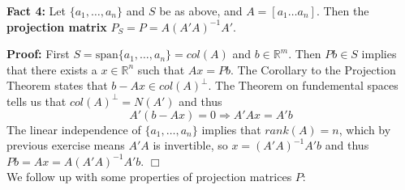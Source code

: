 \documentclass[12pt,oneside]{article}
\begin{document}
\noindent\textbf{Fact 4:} Let \( \{a_1, \dots , a_n\}\)  and \( S\) be as above, and \( A= [a_1 \dots a_n ] \). Then the \textbf{projection matrix} \(P_S=P=A(A'A)^{-1}A'\).

\textbf{Proof:} First \(S=\text{span}\{a_1,\dots,a_n\}=col(A)\) and \(b \in \mathbb{R}^m\). Then \(Pb \in S\) implies that there exists a \(x \in \mathbb{R}^n \) such that \(Ax=Pb\). The Corollary to the Projection Theorem states that \( b-Ax \in col(A)^{\perp}\). The Theorem on fundemental spaces tells us that \( col(A)^{\perp}=N(A') \) and thus 
\[ A'(b-Ax)=0 \Rightarrow  A'Ax=A'b\]
The linear independence of \(\{a_1,\dots,a_n\}\) implies that \(rank(A)=n\), which by previous exercise means \(A'A\) is invertible, so \(x= (A'A)^{-1}A'b\) and thus \(Pb=Ax=A(A'A)^{-1}A'b\).  \(\Box\)\\


 We follow up with some
properties of projection matrices $P$:
\end{document}
